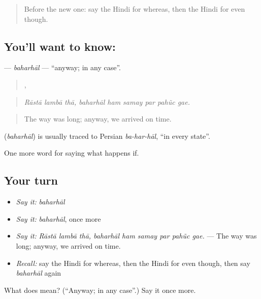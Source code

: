 \begin{quote}
Before the new one: say the Hindi for whereas, then the Hindi for even though.
\end{quote}

\subsection*{You'll want to know: }
\textbf{} — \emph{baharhāl} — \textquotedblleft{}anyway; in any case\textquotedblright{}.

\begin{quote}
  ,      
\end{quote}

\begin{quote}
\emph{Rāstā lambā thā, baharhāl ham samay par pahũc gae.}
\end{quote}

\begin{quote}
The way was long; anyway, we arrived on time.
\end{quote}

\begin{cousinweb}
\textbf{} (\emph{baharhāl}) is usually traced to Persian \emph{ba-har-hāl}, \textquotedblleft{}in every state\textquotedblright{}.
\end{cousinweb}

\begin{grammarlens}[title={What you've built}]
One more word for saying what happens if.
\end{grammarlens}

\subsection*{Your turn}
\begin{itemize}
\raggedright
  \item \emph{Say it:} \emph{baharhāl}
  \item \emph{Say it:} \emph{baharhāl}, once more
  \item \emph{Say it:} \emph{Rāstā lambā thā, baharhāl ham samay par pahũc gae.} — The way was long; anyway, we arrived on time.
  \item \emph{Recall:} say the Hindi for whereas, then the Hindi for even though, then say \emph{baharhāl} again
\end{itemize}

\begin{tcolorbox}[breakable,colback=teal!4,colframe=teal!35!black,title={Before you move on}]
What does  mean? (\textquotedblleft{}Anyway; in any case\textquotedblright{}.) Say it once more.
\end{tcolorbox}
